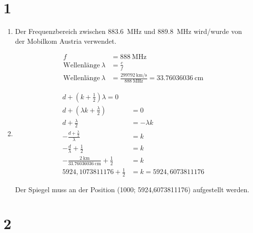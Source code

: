\documentclass[ngerman]{scrartcl}
\begin{document}
\section*{1}
  \begin{enumerate}[label=\alph*)]
    \item
      Der Frequenzbereich zwischen \SI{883,6}{\mega\hertz} und \SI{889,8}{\mega\hertz} wird/wurde von der Mobilkom Austria verwendet.

      \begin{align*}
        f &= \SI{888}{\mega\hertz} \\
        \text{Wellenlänge}\ \lambda &= \frac{c}{f} \\
        \text{Wellenlänge}\ \lambda &= \frac{\SI{299792}{\kilo\meter\per\second}}{\SI{888}{\mega\hertz}} = \SI{33,76036036}{\centi\meter}
      \end{align*}

    \item
      \begin{align*}
        d + (k + \frac{1}{2}) \lambda = 0 \\
        d + (\lambda k + \frac{\lambda}{2}) &= 0 \\
        d + \frac{\lambda}{2} &= -\lambda k \\
        -\frac{d + \frac{\lambda}{2}}{\lambda} &= k \\
        -\frac{d}{\lambda} + \frac{1}{2} &= k \\
        -\frac{\SI{2}{\kilo\meter}}{\SI{33,76036036}{\centi\meter}} + \frac{1}{2} &= k \\
        5924,1073811176 + \frac{1}{2} &= k = 5924,6073811176
      \end{align*}

      Der Spiegel muss an der Position (1000; 5924,6073811176) aufgestellt werden.
  \end{enumerate}

\section*{2}
\end{document}
